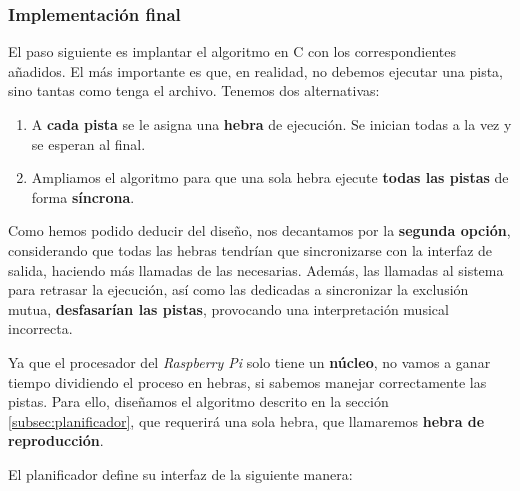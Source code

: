 \subsubsection{Implementación final}

El paso siguiente es implantar el algoritmo en C con los correspondientes añadidos. El más importante es que, en realidad, no debemos ejecutar una pista, sino tantas como tenga el archivo. Tenemos dos alternativas:

\begin{enumerate}
	\item A \textbf{cada pista} se le asigna una \textbf{hebra} de ejecución. Se inician todas a la vez y se esperan al final.
	\item Ampliamos el algoritmo para que una sola hebra ejecute \textbf{todas las pistas} de forma \textbf{síncrona}.
\end{enumerate}

Como hemos podido deducir del diseño, nos decantamos por la \textbf{segunda opción}, considerando que todas las hebras tendrían que sincronizarse con la interfaz de salida, haciendo más llamadas de las necesarias. Además, las llamadas al sistema para retrasar la ejecución, así como las dedicadas a sincronizar la exclusión mutua, \textbf{desfasarían las pistas}, provocando una interpretación musical incorrecta.

Ya que el procesador del \textit{Raspberry Pi} solo tiene un \textbf{núcleo}, no vamos a ganar tiempo dividiendo el proceso en hebras, si sabemos manejar correctamente las pistas. Para ello, diseñamos el algoritmo descrito en la sección \ref{subsec:planificador}, que requerirá una sola hebra, que llamaremos \textbf{hebra de reproducción}.

El planificador define su interfaz de la siguiente manera:

